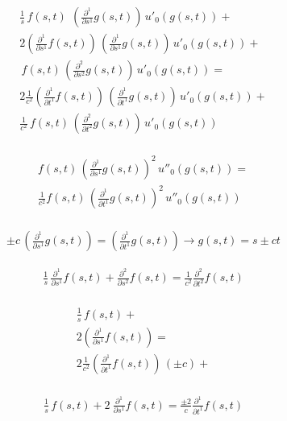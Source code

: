 \documentclass[amsmath,amssymb,floatfix]{revtex4}
\numberwithin{equation}{section}
\newcommand{\pd}[2]{\frac{ \partial ^ #2}{ \partial #1 ^ #2}  }
\begin{document}
\begin{eqnarray*}	 
	  \frac{1}{s} \, f(s,t) \  \, \left( \pd{s}{1} g(s,t)\right) \, u'_0(g(s,t)) + \\ 
	 2 \left( \pd{s}{1} f(s,t) \right) \, \left( \pd{s}{1} g(s,t)\right)  \, u'_0(g(s,t)) + \\
		\, f(s,t)  \, \left( \pd{s}{2} g(s,t)\right) \, u'_0(g(s,t)) =  \\  
	 2 \frac{1}{c^2}\left( \pd{t}{1} f(s,t) \right)   \, \left( \pd{t}{1} g(s,t)\right) \, u'_0(g(s,t)) + \\
		\frac{1}{c^2}\, f(s,t)  \, \left( \pd{t}{2} g(s,t)\right) \, u'_0(g(s,t)) \\
\end{eqnarray*}


\begin{eqnarray*}	
	   f(s,t)  \, \left( \pd{s}{1} g(s,t)\right)^2 \, u''_0(g(s,t)) = \\
	  \frac{1}{c^2} f(s,t)  \, \left( \pd{t}{1} g(s,t)\right)^2 \, u''_0(g(s,t))  \\
\end{eqnarray*}

\begin{eqnarray*}	
	    \pm c \, \left( \pd{s}{1} g(s,t)\right)  = \left( \pd{t}{1} g(s,t)\right)  \rightarrow  g(s,t) = s \pm c t
\end{eqnarray*}

\begin{eqnarray*}	 
	\frac{1}{s} \,  \pd{s}{1} f(s,t)  +  \pd{s}{2} f(s,t)   =  	\frac{1}{c^2}  \pd{t}{2} f(s,t)   \\
\end{eqnarray*}

\begin{eqnarray*}	 
	  \frac{1}{s} \, f(s,t)  + \\ 
	 2 \left( \pd{s}{1} f(s,t) \right)  = \\
	 2 \frac{1}{c^2}\left( \pd{t}{1} f(s,t) \right)  \, (\pm c)  + \\
\end{eqnarray*}

\begin{eqnarray*}	 
	  \frac{1}{s} \, f(s,t)  + 2 \ \pd{s}{1} f(s,t)   =  \frac{\pm2}{c}   \pd{t}{1} f(s,t)   \\
\end{eqnarray*}
\end{document}
